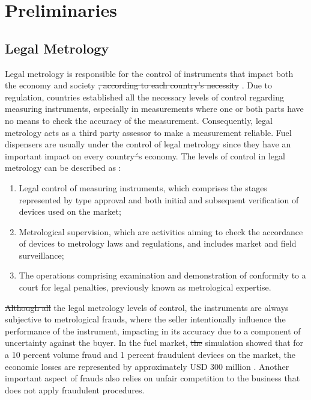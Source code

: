 \documentclass[sigplan]{acmart}
\providecommand{\DIFadd}[1]{{\protect\color{blue}\uwave{#1}}} %
\providecommand{\DIFdel}[1]{{\protect\color{red}\sout{#1}}}                      %
\providecommand{\DIFaddbegin}{} %
\providecommand{\DIFaddend}{} %
\providecommand{\DIFdelbegin}{} %
\providecommand{\DIFdelend}{} %
\begin{document}
\section{Preliminaries}

\subsection{Legal Metrology}

Legal metrology is responsible for the control of instruments that impact both the economy and society \DIFdelbegin \DIFdel{, according to each country's necessity }\DIFdelend \cite{RodriguesFilho2015}.
Due to regulation, countries established all the necessary levels of control regarding measuring instruments, especially in measurements where one or both parts have no means to check the accuracy of the measurement. 
Consequently, legal metrology acts as a third party assessor to make a measurement reliable.
Fuel dispensers are usually under the control of legal metrology since they have an important impact on every country\DIFdelbegin \DIFdel{´}\DIFdelend \DIFaddbegin \DIFadd{'}\DIFaddend s economy. The levels of control in legal metrology can be described as \cite{VIM2012}:

\begin{enumerate}
 \item Legal control of measuring instruments, which comprises the stages represented by type approval and both initial and subsequent verification of devices used on the market;
 \item Metrological supervision, which are activities aiming to check the accordance of devices to metrology laws and regulations, and includes market and field surveillance;
 \item The operations comprising examination and demonstration of conformity to a court for legal penalties, previously known as metrological expertise.
\end{enumerate}

\DIFdelbegin \DIFdel{Although all }\DIFdelend \DIFaddbegin \DIFadd{Despite }\DIFaddend the legal metrology levels of control, the instruments are always subjective to metrological frauds, where the seller intentionally influence the performance of the instrument,  impacting in its accuracy due to a component of uncertainty against the buyer. 
In the fuel market, \DIFdelbegin \DIFdel{the }\DIFdelend \DIFaddbegin \DIFadd{a }\DIFaddend simulation showed that for a 10 percent volume fraud and 1 percent fraudulent devices on the market, the economic losses are represented by approximately USD 300 million \DIFaddbegin \DIFadd{per year }\DIFaddend \citep{RodriguesFilho2016}. 
Another important aspect of frauds also relies on unfair competition to the business that does not apply fraudulent procedures.
\end{document}
